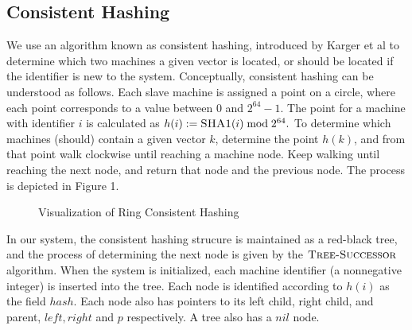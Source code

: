 \subsection{Consistent Hashing}
We use an algorithm known as consistent hashing, introduced by Karger et al \cite{karger1997} to determine which two machines a given vector is located, or
should be located if the identifier is new to the system.
Conceptually, consistent hashing can be understood as follows. Each slave machine is assigned a point on a circle, where each point
corresponds to a value between $0$ and $2^{64}-1.$ The point for a machine with identifier $i$ is calculated as $h(i):=\textsc{SHA1}(i)\bmod 2^{64}.$ To determine which machines (should) contain a given vector $k$, determine the point $h(k)$, and from that point walk clockwise until reaching a machine node. Keep walking until reaching the next node, and return that node and the previous node. The process is depicted in Figure 1.
\begin{figure}
    \centering
    
    \caption{Visualization of Ring Consistent Hashing}
\end{figure}
In our system, the consistent hashing strucure is maintained as a red-black tree, and the process of determining the next node is given by the $\textsc{Tree-Successor}$ algorithm. When the system is initialized,
each machine identifier (a nonnegative integer) is inserted into the tree. Each node is identified according to $h(i)$ as the field $hash$. Each node also has pointers to its left child, right child, and parent, $left, right$ and $p$ respectively.
A tree also has a $nil$ node.

